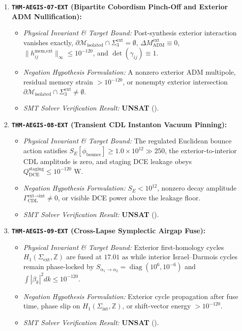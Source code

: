 \documentclass[11pt,onecolumn]{article}
\begin{document}
\begin{enumerate}
    \item \textbf{\texttt{THM-AEGIS-07-EXT} (Bipartite Cobordism Pinch-Off and Exterior ADM Nullification):}
    \begin{itemize}
        \item \emph{Physical Invariant \& Target Bound:} Post-synthesis exterior interaction vanishes exactly, $\partial\mathcal M_{\text{isolated}}\cap\Sigma_3^{\text{ext}}=\emptyset$, $\Delta M_{\text{ADM}}^{\text{ext}}\equiv0$, $\|h_{ij}^{\text{mem,ext}}\|_\infty\le10^{-120}$, and $\det(\gamma_{ij})\equiv1$.
        \item \emph{Negation Hypothesis Formulation:} A nonzero exterior ADM multipole, residual memory strain $>10^{-120}$, or nonempty exterior intersection $\partial\mathcal M_{\text{isolated}}\cap\Sigma_3^{\text{ext}}\neq\emptyset$.
        \item \emph{SMT Solver Verification Result:} \textbf{UNSAT} ().
    \end{itemize}

    \item \textbf{\texttt{THM-AEGIS-08-EXT} (Transient CDL Instanton Vacuum Pinning):}
    \begin{itemize}
        \item \emph{Physical Invariant \& Target Bound:} The regulated Euclidean bounce action satisfies $S_E[\phi_{\text{bounce}}]\ge1.0\times10^{12}\gg250$, the exterior-to-interior CDL amplitude is zero, and staging DCE leakage obeys $Q_{\text{DCE}}^{\text{staging}}\le10^{-120}\text{ W}$.
        \item \emph{Negation Hypothesis Formulation:} $S_E<10^{12}$, nonzero decay amplitude $\Gamma_{\text{CDL}}^{\text{ext}\to\text{int}}\neq0$, or visible DCE power above the leakage floor.
        \item \emph{SMT Solver Verification Result:} \textbf{UNSAT} ().
    \end{itemize}

    \item \textbf{\texttt{THM-AEGIS-09-EXT} (Cross-Lapse Symplectic Airgap Fuse):}
    \begin{itemize}
        \item \emph{Physical Invariant \& Target Bound:} Exterior first-homology cycles $H_1(\Sigma_{\text{ext}},\mathbb Z)$ are fused at $17.01\text{ as}$ while interior Israel--Darmois cycles remain phase-locked by $S_{\alpha_1\to\alpha_2}=\operatorname{diag}(10^6,10^{-6})$ and $\int|\beta_k|^2dk\le10^{-120}$.
        \item \emph{Negation Hypothesis Formulation:} Exterior cycle propagation after fuse time, phase slip on $H_1(\Sigma_{\text{int}},\mathbb Z)$, or shift-vector energy $>10^{-120}$.
        \item \emph{SMT Solver Verification Result:} \textbf{UNSAT} ().
    \end{itemize}


\end{enumerate}
\end{document}
